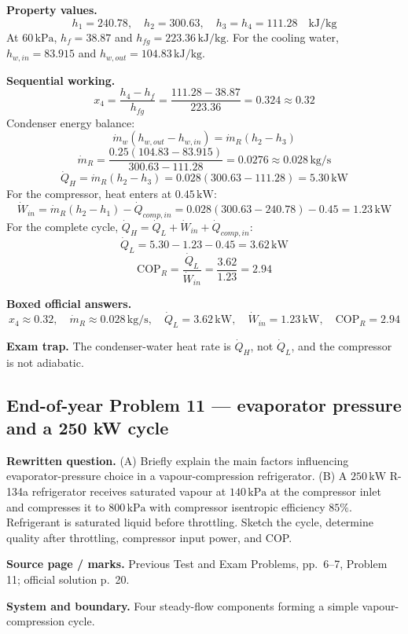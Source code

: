 
\textbf{Property values.}
\[
h_1=240.78,\quad h_2=300.63,\quad h_3=h_4=111.28\quad \mathrm{kJ/kg}
\]
At $60\,\mathrm{kPa}$, $h_f=38.87$ and $h_{fg}=223.36\,\mathrm{kJ/kg}$. For the cooling water, $h_{w,in}=83.915$ and $h_{w,out}=104.83\,\mathrm{kJ/kg}$.

\textbf{Sequential working.}
\[
x_4=\frac{h_4-h_f}{h_{fg}}=\frac{111.28-38.87}{223.36}=0.324\approx0.32
\]
Condenser energy balance:
\[
\dot m_w(h_{w,out}-h_{w,in})=\dot m_R(h_2-h_3)
\]
\[
\dot m_R=\frac{0.25(104.83-83.915)}{300.63-111.28}=0.0276\approx0.028\,\mathrm{kg/s}
\]
\[
\dot Q_H=\dot m_R(h_2-h_3)=0.028(300.63-111.28)=5.30\,\mathrm{kW}
\]
For the compressor, heat enters at $0.45\,\mathrm{kW}$:
\[
\dot W_{in}=\dot m_R(h_2-h_1)-\dot Q_{comp,in}
=0.028(300.63-240.78)-0.45=1.23\,\mathrm{kW}
\]
For the complete cycle, $\dot Q_H=\dot Q_L+\dot W_{in}+\dot Q_{comp,in}$:
\[
\dot Q_L=5.30-1.23-0.45=3.62\,\mathrm{kW}
\]
\[
\mathrm{COP}_R=\frac{\dot Q_L}{\dot W_{in}}=\frac{3.62}{1.23}=2.94
\]

\textbf{Boxed official answers.}
\[
\boxed{x_4\approx0.32,\quad \dot m_R\approx0.028\,\mathrm{kg/s},\quad \dot Q_L=3.62\,\mathrm{kW},\quad \dot W_{in}=1.23\,\mathrm{kW},\quad \mathrm{COP}_R=2.94}
\]

\textbf{Exam trap.} The condenser-water heat rate is $\dot Q_H$, not $\dot Q_L$, and the compressor is not adiabatic.

\subsection*{End-of-year Problem 11 --- evaporator pressure and a 250 kW cycle}
\textbf{Rewritten question.} (A) Briefly explain the main factors influencing evaporator-pressure choice in a vapour-compression refrigerator. (B) A $250\,\mathrm{kW}$ R-134a refrigerator receives saturated vapour at $140\,\mathrm{kPa}$ at the compressor inlet and compresses it to $800\,\mathrm{kPa}$ with compressor isentropic efficiency $85\%$. Refrigerant is saturated liquid before throttling. Sketch the cycle, determine quality after throttling, compressor input power, and COP.

\textbf{Source page / marks.} Previous Test and Exam Problems, pp.~6--7, Problem 11; official solution p.~20.

\textbf{System and boundary.} Four steady-flow components forming a simple vapour-compression cycle.

